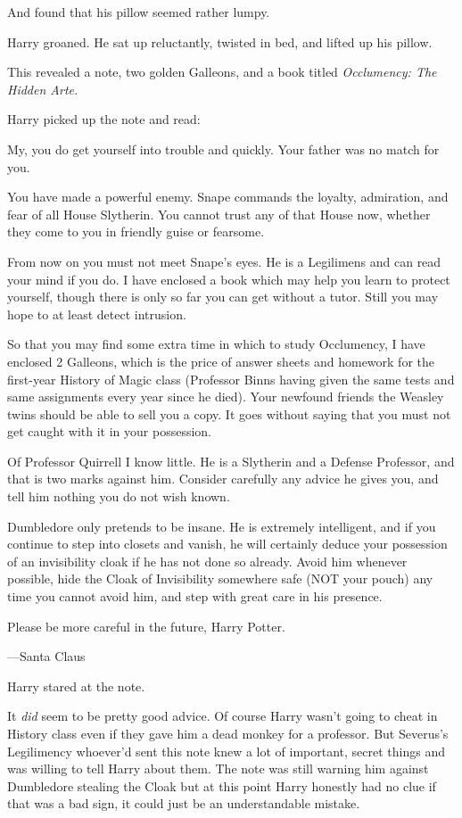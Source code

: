 And found that his pillow seemed rather lumpy.

Harry groaned. He sat up reluctantly, twisted in bed, and lifted up his pillow.

This revealed a note, two golden Galleons, and a book titled \emph{Occlumency:
The Hidden Arte.}

Harry picked up the note and read:

\begin{writtenNote}
My, you do get yourself into trouble and quickly. Your father was no
match for you.

You have made a powerful enemy. Snape commands the loyalty, admiration,
and fear of all House Slytherin. You cannot trust any of that House now,
whether they come to you in friendly guise or fearsome.

From now on you must not meet Snape's eyes. He is a Legilimens and can
read your mind if you do. I have enclosed a book which may help you learn to
protect yourself, though there is only so far you can get without a tutor.
Still you may hope to at least detect intrusion.

So that you may find some extra time in which to study Occlumency, I have
enclosed 2 Galleons, which is the price of answer sheets and homework for the
first-year History of Magic class (Professor Binns having given the same tests
and same assignments every year since he died). Your newfound friends the
Weasley twins should be able to sell you a copy. It goes without saying that
you must not get caught with it in your possession.

Of Professor Quirrell I know little. He is a Slytherin and a Defense
Professor, and that is two marks against him. Consider carefully any advice he
gives you, and tell him nothing you do not wish known.

Dumbledore only pretends to be insane. He is extremely intelligent, and
if you continue to step into closets and vanish, he will certainly deduce your
possession of an invisibility cloak if he has not done so already. Avoid him
whenever possible, hide the Cloak of Invisibility somewhere safe (NOT your
pouch) any time you cannot avoid him, and step with great care in his presence.

Please be more careful in the future, Harry Potter.

—Santa Claus
\end{writtenNote}

Harry stared at the note.

It \emph{did} seem to be pretty good advice. Of course Harry wasn't going to
cheat in History class even if they gave him a dead monkey for a professor. But
Severus's Legilimency{\el} whoever'd sent this note knew a lot of important,
secret things and was willing to tell Harry about them. The note was still
warning him against Dumbledore stealing the Cloak but at this point Harry
honestly had no clue if that was a bad sign, it could just be an understandable
mistake.

